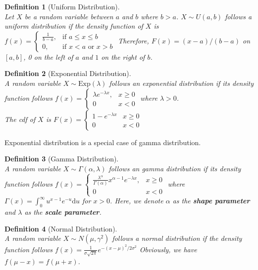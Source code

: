 \documentclass[12pt]{article}
\newcommand{\diff}{\mathrm{d}}
\newcommand{\expo}{\mathrm{Exp}}
\newtheorem{definition}{Definition}[section]
\theoremstyle{definition}
\begin{document}
\begin{definition}[Uniform Distribution]
\hfill\\\normalfont Let $X$ be a random variable between $a$ and $b$ where $b>a$. $X\sim U(a,b)$ follows a uniform distribution if the density function of $X$ is
$
f(x)=\begin{cases}
\frac{1}{b-a},&\text{if } a\leq x\leq b\\
0,\;\;\;      &\text{if } x<a\text{ or }x>b
\end{cases}
$
Therefore, $F(x) = (x-a)/(b-a) $ on $[a,b]$, 0 on the left of $a$ and $1$ on the right of $b$.
\end{definition}
\begin{definition}[Exponential Distribution]
\hfill\\\normalfont A random variable $X\sim\expo(\lambda)$ follows an exponential distribution if its density function follows
$
f(x)=\begin{cases}
\lambda e^{-\lambda x}, &x\geq 0\\
0 &x<0
\end{cases}
$
where $\lambda>0$.\\
The cdf of $X$ is
$
F(x) = \begin{cases}
1-e^{-\lambda x} & x\geq 0\\
0 & x<0
\end{cases}
$
\end{definition}
Exponential distribution is a special case of gamma distribution.
\begin{definition}[Gamma Distribution]
\hfill\\\normalfont A random variable $X\sim\Gamma(\alpha, \lambda)$ follows an gamma distribution if its density function follows
$
f(x) = \begin{cases} \frac{\lambda^\alpha}{\Gamma(\alpha)} x^{\alpha-1}e^{-\lambda x}, &x\geq 0\\
0 & x<0
\end{cases}
$
where $\Gamma(x) = \int_0^\infty u^{x-1}e^{-u}\diff u$ for $x>0$.
Here, we denote $\alpha$ as the \textbf{shape parameter} and $\lambda$ as the \textbf{scale parameter}.
\end{definition}
\begin{definition}[Normal Distribution]
\hfill\\\normalfont A random variable $X\sim N(\mu, \gamma^2)$ follows a normal distribution if the density function follows
$
f(x) = \frac{1}{\sigma \sqrt{2\pi}} e^{-(x-\mu)^2/2\sigma^2}
$
Obviously, we have $f(\mu-x) = f(\mu+x)$.
\end{definition}
\end{document}
